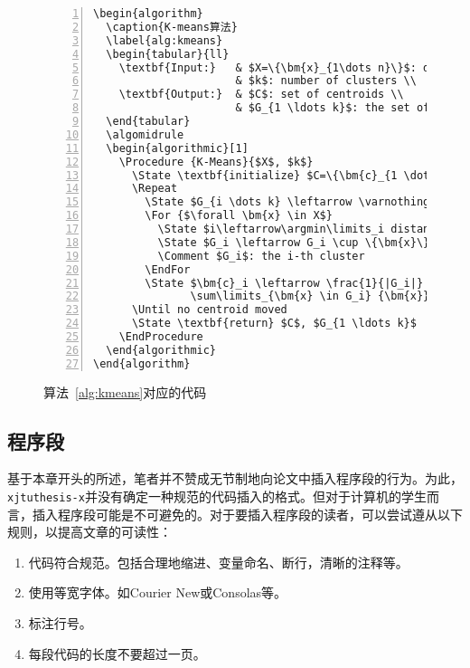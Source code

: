 \begin{figure}[h]
  {
  \fontsize{10pt}{12pt}\selectfont
  \setmainfont{Courier New}
  \begin{lstlisting}[showstringspaces=false,numbers=left,xleftmargin=3em]
\begin{algorithm}
  \caption{K-means算法}
  \label{alg:kmeans}
  \begin{tabular}{ll}
    \textbf{Input:}   & $X=\{\bm{x}_{1\dots n}\}$: dataset \\
                      & $k$: number of clusters \\
    \textbf{Output:}  & $C$: set of centroids \\
                      & $G_{1 \ldots k}$: the set of clusters \\
  \end{tabular}
  \algomidrule
  \begin{algorithmic}[1]
    \Procedure {K-Means}{$X$, $k$}
      \State \textbf{initialize} $C=\{\bm{c}_{1 \dots k}\}$ at random
      \Repeat
        \State $G_{i \dots k} \leftarrow \varnothing$
        \For {$\forall \bm{x} \in X$}
          \State $i\leftarrow\argmin\limits_i distance(\bm{x}, \bm{c}_i)$
          \State $G_i \leftarrow G_i \cup \{\bm{x}\}$
          \Comment $G_i$: the i-th cluster
        \EndFor
        \State $\bm{c}_i \leftarrow \frac{1}{|G_i|}
               \sum\limits_{\bm{x} \in G_i} {\bm{x}}$
      \Until no centroid moved
      \State \textbf{return} $C$, $G_{1 \ldots k}$
    \EndProcedure
  \end{algorithmic}
\end{algorithm}

  \end{lstlisting}
  }
\caption{算法~\ref{alg:kmeans}对应的代码}
\label{fig:kmeans}
\end{figure}

\subsection{程序段}
基于本章开头的所述，笔者并不赞成无节制地向论文中插入程序段的行为。为此，\texttt{xjtuthesis-x}并没有确定一种规范的代码插入的格式。但对于计算机的学生而言，插入程序段可能是不可避免的。对于要插入程序段的读者，可以尝试遵从以下规则，以提高文章的可读性：
\begin{enumerate}
  \item 代码符合规范。包括合理地缩进、变量命名、断行，清晰的注释等。
  \item 使用等宽字体。如Courier New或Consolas等。
  \item 标注行号。
  \item 每段代码的长度不要超过一页。
\end{enumerate}

